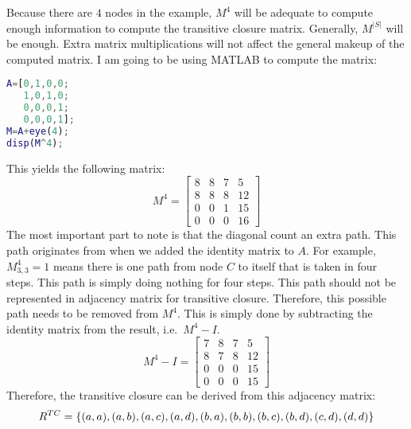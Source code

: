Because there are \(4\) nodes in the example, \(M^4\) will be adequate to compute enough information to compute the
transitive closure matrix. Generally, \(M^{|S|}\) will be enough. Extra matrix multiplications will not affect the
general makeup of the computed matrix. I am going to be using MATLAB to compute the matrix:
\begin{lstlisting}[language=Matlab]
A=[0,1,0,0;
   1,0,1,0;
   0,0,0,1;
   0,0,0,1];
M=A+eye(4);   
disp(M^4); 
\end{lstlisting}
This yields the following matrix:
\[M^4=\begin{bmatrix}
    8 & 8 & 7 &  5 \\
    8 & 8 & 8 & 12 \\
    0 & 0 & 1 & 15 \\
    0 & 0 & 0 & 16
\end{bmatrix}\]
The most important part to note is that the diagonal count an extra path. This path originates from when we added the identity
matrix to \(A\). For example, \(M^4_{3,3}=1\) means there is one path from node \(C\) to itself that is taken in four steps.
This path is simply doing nothing for four steps. This path should not be represented in adjacency matrix for transitive closure.
Therefore, this possible path needs to be removed from \(M^4\). This is simply done by subtracting the identity matrix
from the result, i.e.\ \(M^4-I\). 
\[M^4-I=\begin{bmatrix}
    7 & 8 & 7 &  5 \\
    8 & 7 & 8 & 12 \\
    0 & 0 & 0 & 15 \\
    0 & 0 & 0 & 15
\end{bmatrix}\]
Therefore, the transitive closure can be derived from this adjacency matrix:
\[R^{TC}=\{(a,a),(a,b),(a,c),(a,d),(b,a),(b,b),(b,c),(b,d),(c,d),(d,d)\}\]

